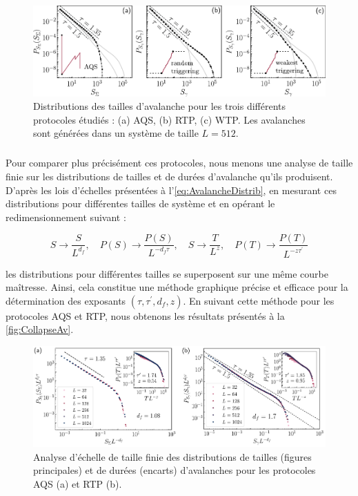 \begin{figure}[h]
	\centering
	\includegraphics[width=\textwidth]{Chapitre4/Figures/Avalanches/Comparaison_Distrib.pdf}
	\caption{Distributions des tailles d'avalanche pour les trois différents protocoles étudiés : (a) AQS, (b) RTP, (c) WTP. Les avalanches sont générées dans un système de taille $L=512$.}
	\label{fig:DistribProtocols}
\end{figure}

\subparagraph{}Pour comparer plus précisément ces protocoles, nous menons une analyse de taille finie sur les distributions de tailles et de durées d'avalanche qu'ils produisent. D'après les lois d'échelles présentées à l'\autoref{eq:AvalancheDistrib}, en mesurant ces distributions pour différentes tailles de système et en opérant le redimensionnement suivant :

\begin{equation}
	S \rightarrow \frac{S}{L^{d_f}}, \quad P(S) \rightarrow \frac{P(S)}{L^{-d_f\tau}},\quad S \rightarrow \frac{T}{L^{z}}, \quad P(T) \rightarrow \frac{P(T)}{L^{-z\tau^\prime}}
\end{equation}

\noindent les distributions pour différentes tailles se superposent sur une même courbe maîtresse. Ainsi, cela constitue une méthode graphique précise et efficace pour la détermination des exposants $(\tau, \tau^\prime, d_f, z)$. En suivant cette méthode pour les protocoles AQS et RTP, nous obtenons les résultats présentés à la \autoref{fig:CollapseAv}.

\begin{figure}[h]
	\centering
	\includegraphics[width=\textwidth]{Chapitre4/Figures/Avalanches/Collapse.pdf}
	\caption{Analyse d'échelle de taille finie des distributions de tailles (figures principales) et de durées (encarts) d'avalanches pour les protocoles AQS (a) et RTP (b).}
	\label{fig:CollapseAv}
\end{figure}

